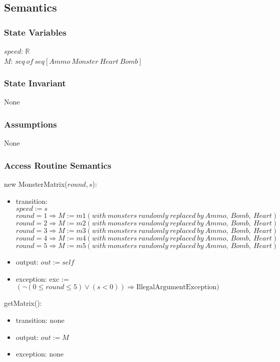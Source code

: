 \documentclass[12pt]{article}
\begin{document}
\subsection*{Semantics}
\subsubsection*{State Variables}
$\mathit{speed}$: $\mathbb{R}$\\
$\mathit{M}$: $seq\ of\ seq[Ammo\ Monster\ Heart\ Bomb]$\\
\subsubsection*{State Invariant}
None
\subsubsection*{Assumptions}
None
\newpage
\subsubsection*{Access Routine Semantics}
\noindent new MonsterMatrix($\mathit{round}, \mathit{s}$):
\begin{itemize}
\item transition: \\$\mathit{speed} := s$\\
$\mathit{round} = 1 \Rightarrow M := m1(with\ monsters\ randomly\ replaced\ by\ Ammo,\ Bomb,\ Heart)$\\
$\mathit{round} = 2 \Rightarrow M := m2(with\ monsters\ randomly\ replaced\ by\ Ammo,\ Bomb,\ Heart)$\\
$\mathit{round} = 3 \Rightarrow M := m3(with\ monsters\ randomly\ replaced\ by\ Ammo,\ Bomb,\ Heart)$\\
$\mathit{round} = 4 \Rightarrow M := m4(with\ monsters\ randomly\ replaced\ by\ Ammo,\ Bomb,\ Heart)$\\
$\mathit{round} = 5 \Rightarrow M := m5(with\ monsters\ randomly\ replaced\ by\ Ammo,\ Bomb,\ Heart)$
\item output: $out := \mathit{self}$
\item exception: exc := $(\lnot (0 \leq \mathit{round} \leq 5) \vee (\mathit{s} < 0)) \Rightarrow \text{IllegalArgumentException})$
\end{itemize}

\noindent getMatrix():
\begin{itemize}
\item transition: none
\item output: $out := M$
\item exception: none
\end{itemize}
\end{document}
